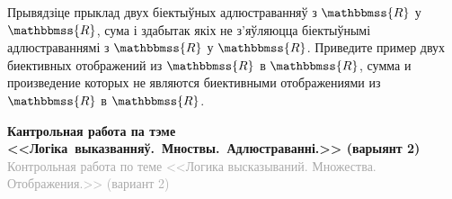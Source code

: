 \begin{problemList}
\problemItemSimple
{Прывядзіце прыклад двух біектыўных адлюстраванняў з $\mathbbmss{R}$ у $\mathbbmss{R}$, сума і здабытак якіх не з'яўляюцца біектыўнымі адлюстраваннямі з $\mathbbmss{R}$ у $\mathbbmss{R}$.}
{Приведите пример двух биективных отображений из $\mathbbmss{R}$ в $\mathbbmss{R}$, сумма и произведение которых не являются биективными отображениями из $\mathbbmss{R}$ в $\mathbbmss{R}$.}

\end{problemList}	

\newpage

\begin{center}
	\textbf{Кантрольная работа па тэме <<Логіка~выказванняў.~Мноствы.~Адлюстраванні.>> (варыянт 2)} \\
	{\small \textcolor{darkgray}{Контрольная работа по теме <<Логика высказываний. Множества. Отображения.>> (вариант 2)}}
\end{center}

